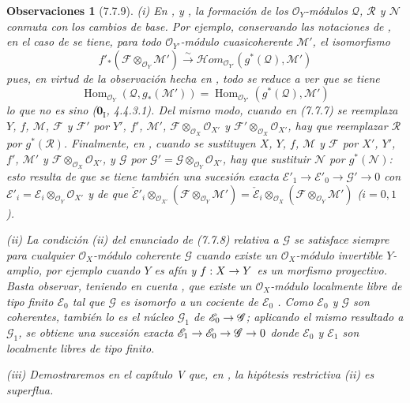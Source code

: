 \documentclass[10pt,oneside,openany]{book}
\theoremstyle{egaenv}\newtheorem*{env}{---}
\theoremstyle{egastatement}
\theoremstyle{egadescription}
\newtheorem*{remarks}{Observaciones}
\renewcommand{\to}{\mathchoice{\longrightarrow}{\rightarrow}{\rightarrow}{\rightarrow}}
\begin{document}
\begin{remarks}[7.7.9]
\label{III.7.7.9}
\textnormal{(i)} En ,  y
, la formación de los $\mathscr O_Y$-módulos $\mathscr Q$,
$\mathscr R$ y $\mathscr N$ \emph{conmuta con los cambios de base}. Por ejemplo,
conservando las notaciones de , en el caso de
 se tiene, para todo $\mathscr O_{Y'}$-módulo cuasicoherente
$\mathscr M'$, el isomorfismo
\[
  f'_*(\mathscr F\otimes_{\mathscr O_Y}\mathscr M')
  \xrightarrow{\sim}
  \mathscr{H}\!om_{\mathscr O_{Y'}}(g^*(\mathscr Q),\mathscr M')
\]
pues, en virtud de la observación hecha en , todo se reduce a
ver que se tiene
\[
  \operatorname{Hom}_{\mathscr O_Y}(\mathscr Q,g_*(\mathscr M'))
  =
  \operatorname{Hom}_{\mathscr O_{Y'}}(g^*(\mathscr Q),\mathscr M')
\]
lo que no es sino ($\mathbf{0}_{\mathrm I}$, 4.4.3.1). Del mismo modo, cuando en (7.7.7)
se reemplaza $Y$, $f$, $\mathscr M$, $\mathscr F$ y
$\mathscr F'$ por $Y'$, $f'$, $\mathscr M'$,
$\mathscr F\otimes_{\mathscr O_X}\mathscr O_{X'}$ y
$\mathscr F'\otimes_{\mathscr O_X}\mathscr O_{X'}$, hay que reemplazar
$\mathscr R$ por $g^*(\mathscr R)$. Finalmente, en
, cuando se sustituyen $X$, $Y$, $f$, $\mathscr M$ y
$\mathscr F$ por $X'$, $Y'$, $f'$, $\mathscr M'$ y
$\mathscr F\otimes_{\mathscr O_X}\mathscr O_{X'}$, y $\mathscr G$ por
$\mathscr G'=\mathscr G\otimes_{\mathscr O_Y}\mathscr O_{X'}$,
hay que sustituir $\mathscr N$ por $g^*(\mathscr N)$: esto resulta de que se tiene también una
sucesión exacta
$\mathscr E'_1\longrightarrow\mathscr E'_0\longrightarrow\mathscr G'\longrightarrow0$ con
$\mathscr E'_i=\mathscr E_i\otimes_{\mathscr O_Y}\mathscr O_{X'}$
y de que
$  \check{\mathscr E}'_i
  \otimes_{\mathscr O_{X'}}
  (\mathscr F\otimes_{\mathscr O_Y}\mathscr M')
  =
  \check{\mathscr E}_i
  \otimes_{\mathscr O_X}
  (\mathscr F\otimes_{\mathscr O_Y}\mathscr M')$ ($i=0,1$).

\medskip
\textnormal{(ii)} La condición (ii) del enunciado de (7.7.8) relativa a
$\mathscr G$ se satisface siempre para cualquier
$\mathscr O_X$-módulo coherente $\mathscr G$ cuando existe un
$\mathscr O_X$-módulo invertible $Y$-\emph{amplio}, por ejemplo cuando $Y$ es afín y
$f:X\to Y$ es un morfismo \emph{proyectivo}. Basta observar, teniendo en cuenta
, que existe un $\mathscr O_X$-módulo localmente libre de
tipo finito $\mathscr E_0$ tal que $\mathscr G$ es isomorfo a un cociente de
$\mathscr E_0$ . Como $\mathscr E_0$ y $\mathscr G$ son
coherentes, también lo es el núcleo $\mathscr G_1$ de
$\mathscr E_0\to\mathscr G$; aplicando el mismo resultado a $\mathscr G_1$, se
obtiene una sucesión exacta
$\mathscr E_1\to\mathscr E_0\to\mathscr G\to0$
donde $\mathscr E_0$ y $\mathscr E_1$ son localmente libres de tipo finito.

\medskip
\textnormal{(iii)} Demostraremos en el capítulo V que, en
, la hipótesis restrictiva (ii) es \emph{superflua}.
\end{remarks}
\end{document}
